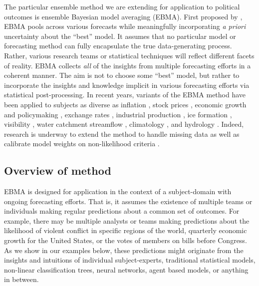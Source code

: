 The particular ensemble method we are extending for application to
political outcomes is ensemble Bayesian model averaging (EBMA). First
proposed by \citet{Raftery:2005}, EBMA pools across various forecasts
while meaningfully incorporating \textit{a priori} uncertainty about
the ``best'' model.  It assumes that no particular model or
forecasting method can fully encapsulate the true data-generating
process.  Rather, various research teams or statistical techniques
will reflect different facets of reality. EBMA collects \textit{all}
of the insights from multiple forecasting efforts in a coherent
manner.  The aim is not to choose some ``best'' model, but rather to
incorporate the insights and knowledge implicit in various forecasting
efforts via statistical post-processing.  In recent years, variants of
the EBMA method have been applied to subjects as diverse as inflation
\citep{Wright:2009, Koop:2010, Gneiting:2010}, stock prices
\citep{Billio:2011}, economic growth and policymaking
\citep{Brock:2007, Billio:2010}, exchange rates \citep{Wright:2008},
industrial production \citep{Feldkircher:2010}, ice formation
\citep{Berrocal:2010}, visibility \citep{Chmielecki:2010}, water
catchment streamflow \citep{Viney:2009}, climatology \citep{Min:2006,
  Min:2007, Smith:2009}, and hydrology \citep{Zhang:2009}.  Indeed,
research is underway to extend the method to handle missing data
\citep{Fraley:2010, Mccandless:2011} as well as calibrate model
weights on non-likelihood criteria \citep[e.g.,][]{Vrugt:2006}.



\subsection{Overview of method}

EBMA is designed for application in the context of a subject-domain
with ongoing forecasting efforts.  That is, it assumes the existence
of multiple teams or individuals making regular predictions about a
common set of outcomes.  For example, there may be multiple analysts
or teams making predictions about the likelihood of violent conflict
in specific regions of the world, quarterly economic growth for the
United States, or the votes of members on bills before Congress.  As
we show in our examples below, these predictions might originate from
the insights and intuitions of individual subject-experts, traditional
statistical models, non-linear classification trees, neural networks,
agent based models, or anything in between. 

